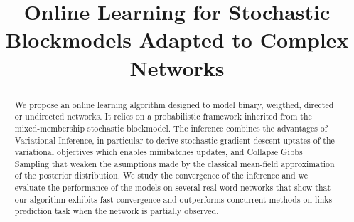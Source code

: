 \documentclass{article}
\begin{document}
\title{Online Learning for Stochastic Blockmodels Adapted to Complex Networks}
	
\maketitle

\begin{abstract}
We propose an online learning algorithm designed to model binary, weigthed, directed or undirected networks. It relies on a probabilistic framework inherited from the mixed-membership stochastic blockmodel. The inference combines the advantages of Variational Inference, in particular to derive stochastic gradient descent uptates of the variational objectives which enables minibatches updates, and Collapse Gibbs Sampling that weaken the asumptions made by the classical mean-field approximation of the posterior distribution. We study the convergence of the inference and we evaluate the performance of the models on several real word networks that show that our algorithm exhibits fast convergence and outperforms concurrent methods on links prediction task when the network is partially observed.
\end{abstract}



%


\clearpage


%



\appendix
\end{document}
